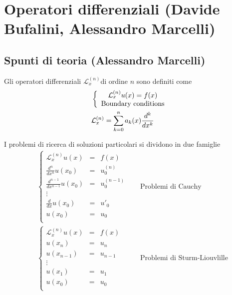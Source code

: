 \section{Operatori differenziali (Davide Bufalini, Alessandro Marcelli)}

\subsection{Spunti di teoria (Alessandro Marcelli)}

Gli operatori differenziali $\mathcal{L}_x^{(n)}$di ordine $n$ sono definiti come
\begin{align}
	&\left\{ \begin{array}{cc} \mathcal{L}_x^{(n)} u(x) = f(x)\\ \text{Boundary conditions} \end{array} \right.\\
	&\mathcal{L}_x^{(n)} = \sum_{k=0}^{n} a_k(x) \frac{d^k}{dx^k}
\end{align}


I problemi di ricerca di soluzioni particolari si dividono in due famiglie
\begin{align}
	&\left\{
	\begin{array}{ccc}
		\mathcal{L}_x^{(n)} u(x) &= &f(x)\\
		\frac{d^n}{dx^n}u(x_0) &= &u^{(n)}_0\\
		\frac{d^{n-1}}{dx^{n-1}}u(x_0) &= &u^{(n-1)}_0\\
		\vdots\\
		\frac{d}{dx}u(x_0) &= &u'_0\\
		u(x_0) &= &u_0\\
	\end{array}
	\right. \quad &\text{Problemi di Cauchy}\\
	&\left\{
	\begin{array}{ccc}
		\mathcal{L}_x^{(n)} u(x) &= &f(x)\\
		u(x_n) &= &u_n\\
		u(x_{n-1}) &= &u_{n-1}\\
		\vdots\\
		u(x_1) &= &u_1\\
		u(x_0) &= &u_0\\
	\end{array}
	\right. \quad &\text{Problemi di Sturm-Liouvlille}
\end{align}

